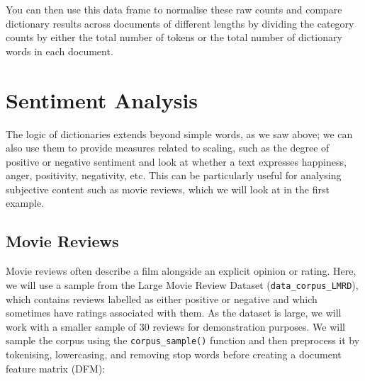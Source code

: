 \documentclass[
]{book}
\begin{document}
You can then use this data frame to normalise these raw counts and compare dictionary results across documents of different lengths by dividing the category counts by either the total number of tokens or the total number of dictionary words in each document.

\section{Sentiment Analysis}\label{sentiment-analysis}

The logic of dictionaries extends beyond simple words, as we saw above; we can also use them to provide measures related to scaling, such as the degree of positive or negative sentiment and look at whether a text expresses happiness, anger, positivity, negativity, etc. This can be particularly useful for analysing subjective content such as movie reviews, which we will look at in the first example.

\subsection{Movie Reviews}\label{movie-reviews}

Movie reviews often describe a film alongside an explicit opinion or rating. Here, we will use a sample from the Large Movie Review Dataset (\texttt{data\_corpus\_LMRD}), which contains reviews labelled as either positive or negative and which sometimes have ratings associated with them. As the dataset is large, we will work with a smaller sample of 30 reviews for demonstration purposes. We will sample the corpus using the \texttt{corpus\_sample()} function and then preprocess it by tokenising, lowercasing, and removing stop words before creating a document feature matrix (DFM):
\end{document}
